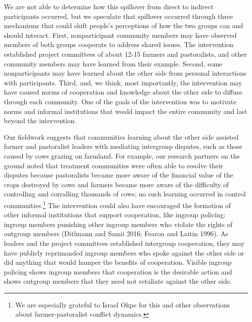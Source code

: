 \documentclass[11pt]{article}
\begin{document}
We are not able to determine how this spillover from direct to indirect
participants occurred, but we speculate that spillover occurred through
three mechanisms that could shift people's perceptions of how the two
groups can and should interact. First, nonparticipant community members
may have observed members of both groups cooperate to address shared
issues. The intervention established project committees of about 12-15
farmers and pastoralists, and other community members may have learned
from their example. Second, some nonparticipants may have learned about
the other side from personal interactions with participants. Third, and,
we think, most importantly, the intervention may have caused norms of
cooperation and knowledge about the other side to diffuse through each
community. One of the goals of the intervention was to motivate norms
and informal institutions that would impact the entire community and
last beyond the intervention.

Our fieldwork suggests that communities learning about the other side
assisted farmer and pastoralist leaders with mediating intergroup
disputes, such as those caused by cows grazing on farmland. For example,
our research partners on the ground noted that treatment communities
were often able to resolve their disputes because pastoralists became
more aware of the financial value of the crops destroyed by cows and
farmers became more aware of the difficulty of controlling and
corralling thousands of cows; no such learning occurred in control
communities.\footnote{We are especially grateful to Israel Okpe for this
  and other observations about farmer-pastoralist conflict dynamics.}
The intervention could also have encouraged the formation of other
informal institutions that support cooperation, like ingroup policing:
ingroup members punishing other ingroup members who violate the rights
of outgroup members (Ditlmann and Samii 2016; Fearon and Laitin 1996).
As leaders and the project committees established intergroup
cooperation, they may have publicly reprimanded ingroup members who
spoke against the other side or did anything that would hamper the
benefits of cooperation. Visible ingroup policing shows ingroup members
that cooperation is the desirable action and shows outgroup members that
they need not retaliate against the other side.
\end{document}
